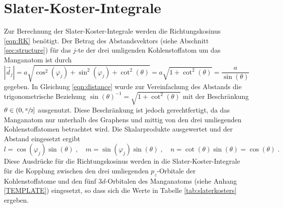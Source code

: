 \section{Slater-Koster-Integrale}
\label{sec:slaterkostercalc}
Zur Berechnung der Slater-Koster-Integrale werden die Richtungskosinus \eqref{eqn:RK} benötigt.
Der Betrag des Abstandsvektors (siehe Abschnitt \ref{sec:structure}) für das $j$-te der drei umligenden Kohlenstoffatom um das Manganatom ist durch 
\begin{equation}
    \left | \vec{d}_j  \right | = a \sqrt{\cos^2(\varphi_j) + \sin^2(\varphi_j) + \cot^2(\theta)} = a \sqrt{1+\cot^2(\theta)} = \frac{a}{\sin(\theta)} \label{eqn:distance}
\end{equation}
gegeben.
In Gleichung \eqref{eqn:distance} wurde zur Vereinfachung des Abstands die trigonometrische Beziehung $ \sin(\theta)^{-1} = \sqrt{1+\cot^2(\theta)}$ \cite{trig} mit der Beschränkung
$\theta \in ( 0, \sfrac{\pi}{2} ] $ ausgenutzt. 
Diese Beschränkung ist jedoch gerechtfertigt, da das Manganatom nur unterhalb des Graphens und mittig von den drei umliegenden Kohlenstoffatomen betrachtet wird.
Die Skalarprodukte ausgewertet und der Abstand eingesetzt ergibt
\begin{equation*}
    l = \cos(\varphi_j) \sin(\theta) \; , \quad
    m = \sin(\varphi_j) \sin(\theta) \; , \quad
    n = \cot(\theta) \sin(\theta) = \cos(\theta) \; .
\end{equation*}
Diese Ausdrücke für die Richtungskosinus werden in die Slater-Koster-Integrale für die Kopplung zwischen den drei umliegenden 
$p_z$-Orbitale der Kohlenstoffatome und den fünf $3d$-Orbitalen des Manganatoms (siehe Anhang \ref{TEMPLATE}) eingesetzt,
so dass sich die Werte in Tabelle \ref{tab:slaterkosters} ergeben.
